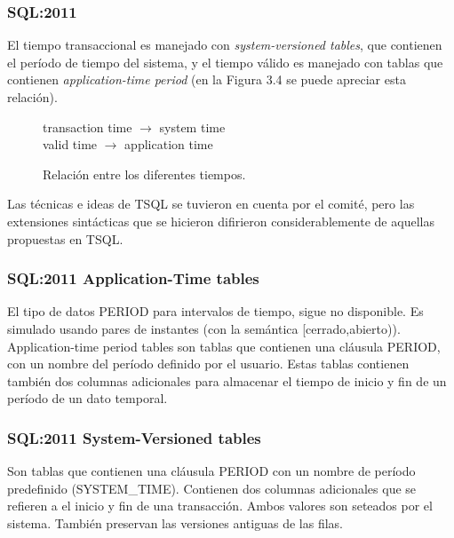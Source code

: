 \documentclass[a4paper,12pt,oneside]{report}
\begin{document}
\subsubsection*{SQL:2011}
El tiempo transaccional es manejado con \textit{system-versioned tables}, que contienen el per\'iodo de tiempo del sistema, y el tiempo v\'alido es manejado con tablas que contienen \textit{application-time period} (en la Figura 3.4 se puede apreciar esta relaci\'on).\\
\begin{figure}[h]
\center
transaction time $\rightarrow$ system time\\
valid time $\rightarrow$ application time\\
\caption{Relaci\'on entre los diferentes tiempos.}
\end{figure}Las t\'ecnicas e ideas de TSQL se tuvieron en cuenta por el comit\'e, pero las extensiones sint\'acticas que se hicieron difirieron considerablemente de aquellas propuestas en TSQL.
\subsubsection*{SQL:2011 Application-Time tables}
El tipo de datos PERIOD para intervalos de tiempo, sigue no disponible. Es simulado usando pares de instantes (con la sem\'antica [cerrado,abierto)).
Application-time period tables son tablas que contienen una cl\'ausula PERIOD, con un nombre del per\'iodo definido por el usuario. Estas tablas contienen tambi\'en dos columnas adicionales para almacenar el tiempo de inicio y fin de un per\'iodo de un dato temporal.
\subsubsection*{SQL:2011 System-Versioned tables}
Son tablas que contienen una cl\'ausula PERIOD con un nombre de per\'iodo predefinido (SYSTEM\_TIME). Contienen dos columnas adicionales que se refieren a el inicio y fin de una transacci\'on. Ambos valores son seteados por el sistema. Tambi\'en preservan las versiones antiguas de las filas.
\end{document}
